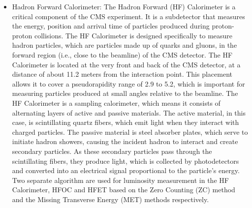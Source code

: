 \begin{itemize}

\item Hadron Forward Calorimeter: The Hadron Forward (HF) Calorimeter is a critical component of the CMS experiment. It is a subdetector that measures the energy, position and arrival time of particles produced during proton-proton collisions. The HF Calorimeter is designed specifically to measure hadron particles, which are particles made up of quarks and gluons, in the forward region (i.e., close to the beamline) of the CMS detector. The HF Calorimeter is located at the very front and back of the CMS detector, at a distance of about 11.2 meters from the interaction point. This placement allows it to cover a pseudorapidity range of 2.9 to 5.2, which is important for measuring particles produced at small angles relative to the beamline. The HF Calorimeter is a sampling calorimeter, which means it consists of alternating layers of active and passive materials. The active material, in this case, is scintillating quartz fibers, which emit light when they interact with charged particles. The passive material is steel absorber plates, which serve to initiate hadron showers, causing the incident hadron to interact and create secondary particles. As these secondary particles pass through the scintillating fibers, they produce light, which is collected by photodetectors and converted into an electrical signal proportional to the particle's energy. Two separate algorithm are used for luminosity measurement in the HF Calorimeter, HFOC and HFET based on the Zero Counting (ZC) method and the Missing Transverse Energy (MET) methods respectively. %


\end{itemize}
